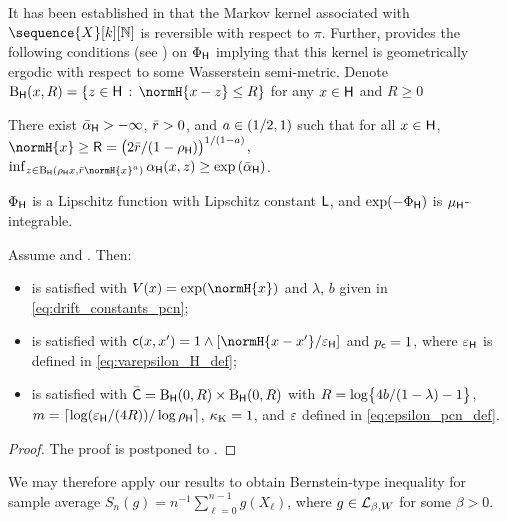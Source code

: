 It has been established in \cite{beskos:roberts:stuart:voss:2008,cotter:roberts:stuart:white:2013} that the Markov kernel associated with $\sequence{X}[k][\nset]$ is reversible with respect to $\pi$. Further,  \cite{hairer:stuart:vollmer:2012} provides the following conditions (see \cite[Assumptions~2.10-2.11]{hairer:stuart:vollmer:2012}) on $\Phi_{\mathsf{H}}$ implying that this kernel is geometrically ergodic with respect to some Wasserstein semi-metric. Denote $\ballH{x}{R} = \{z \in \msh \,: \, \normH{x-z} \leq R\}$ for any $x \in\mathsf{H}$ and $R\geq 0$
\begin{assumptionpCN}
\label{assum:d-small-set-pCN}
There exist  $\bar{\alpha}_{\mathsf{H}} >-\infty$, $\bar{r} >0$, and $a \in \left(1/2,1\right)$
such that for all $x \in \mathsf{H}$, $\normH{x} \geq \RpCN = \bigl(2 \rpCNconst/ (1 - \rhoH)\bigr)^{1/(1-a)}$,
$\inf_{z \in \ballH{\rhoH x}{\rpCNconst \normH{x}^a}} \alphaH(x, z) \geq \exp \left(\alphalpCN\right)$.
\end{assumptionpCN}
\begin{assumptionpCN}
\label{assum:potU-lipshitz}
$\Phi_{\mathsf{H}}$ is a Lipschitz function with Lipschitz constant $\mathsf{L}$, and $\exp(- \Phi_{\mathsf{H}})$ is $\mu_{\mathsf{H}}$-integrable.
\end{assumptionpCN}
\begin{proposition}
\label{prop:pCN}
Assume   and  . Then:
\begin{itemize}
\item {} is satisfied with $V(x)= \exp(\normH{x})$ and $\lambda$, $b$ given in \eqref{eq:drift_constants_pcn};
\item {} is satisfied with $\cost(x,x') = 1 \wedge [\normH{x-x'}/\varepsilonH]$ and $p_{\mathsf{c}}=1$, where $\varepsilon_{\mathsf{H}}$ is defined in \eqref{eq:varepsilon_H_def};
\item {} is satisfied  with $\bar{\mathsf{C}} = \operatorname{B}_{\mathsf{H}}(0,R) \times \operatorname{B}_{\mathsf{H}}(0,R)$  with $R = \log\bigl\{4b/(1-\lambda) - 1 \bigr\}$, $m = \lceil \log(\varepsilon_{\mathsf{H}}/(4R))/\log\rho_{\mathsf{H}} \rceil$, $\kappa_{{\rm K}}= 1$, and $\varepsilon$ defined in \eqref{eq:epsilon_pcn_def}.
\end{itemize}
\end{proposition}
\begin{proof}
The proof is postponed to .
\end{proof}

We may therefore apply our results to obtain Bernstein-type inequality for sample average $S_n(g) = n^{-1} \sum_{\ell = 0}^{n-1} g(X_\ell)$, where $g \in  \mathcal L_{\beta, W}$ for some $\beta > 0$.

